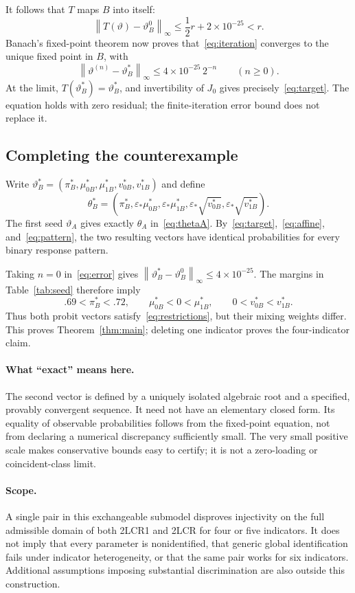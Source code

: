 \documentclass[11pt,a4paper]{article}
\numberwithin{equation}{section}
\newcommand{\vt}{\vartheta}
\newcommand{\norm}[1]{\left\lVert#1\right\rVert_\infty}
\begin{document}
It follows that $T$ maps $B$ into itself:
\[
 \norm{T(\vt)-\vt_B^0}
 \le\frac12r+2\times10^{-25}<r.
\]
Banach's fixed-point theorem now proves that~\eqref{eq:iteration} converges to the unique fixed point in $B$, with
\begin{equation}\label{eq:error}
 \norm{\vt^{(n)}-\vt_B^*}\le4\times10^{-25}\,2^{-n}\qquad(n\ge0).
\end{equation}
At the limit, $T(\vt_B^*)=\vt_B^*$, and invertibility of $J_0$ gives precisely~\eqref{eq:target}. The equation holds with zero residual; the finite-iteration error bound does not replace it.

\subsection{Completing the counterexample}
Write $\vt_B^*=(\pi_B^*,\mu_{0B}^*,\mu_{1B}^*,v_{0B}^*,v_{1B}^*)$ and define
\begin{equation}\label{eq:thetaB}
 \theta_B^*=\left(\pi_B^*,\varepsilon_*\mu_{0B}^*,
 \varepsilon_*\mu_{1B}^*,\varepsilon_*\sqrt{v_{0B}^*},
 \varepsilon_*\sqrt{v_{1B}^*}\right).
\end{equation}
The first seed $\vt_A$ gives exactly $\theta_A$ in~\eqref{eq:thetaA}. By~\eqref{eq:target},~\eqref{eq:affine}, and~\eqref{eq:pattern}, the two resulting vectors have identical probabilities for every binary response pattern.

Taking $n=0$ in~\eqref{eq:error} gives $\norm{\vt_B^*-\vt_B^0}\le4\times10^{-25}$. The margins in Table~\ref{tab:seed} therefore imply
\[
 .69<\pi_B^*<.72,\qquad \mu_{0B}^*<0<\mu_{1B}^*,
 \qquad 0<v_{0B}^*<v_{1B}^*.
\]
Thus both probit vectors satisfy~\eqref{eq:restrictions}, but their mixing weights differ. This proves Theorem~\ref{thm:main}; deleting one indicator proves the four-indicator claim.

\paragraph{What ``exact'' means here.}
The second vector is defined by a uniquely isolated algebraic root and a specified, provably convergent sequence. It need not have an elementary closed form. Its equality of observable probabilities follows from the fixed-point equation, not from declaring a numerical discrepancy sufficiently small. The very small positive scale makes conservative bounds easy to certify; it is not a zero-loading or coincident-class limit.

\paragraph{Scope.}
A single pair in this exchangeable submodel disproves injectivity on the full admissible domain of both 2LCR1 and 2LCR for four or five indicators. It does not imply that every parameter is nonidentified, that generic global identification fails under indicator heterogeneity, or that the same pair works for six indicators. Additional assumptions imposing substantial discrimination are also outside this construction.
\end{document}
